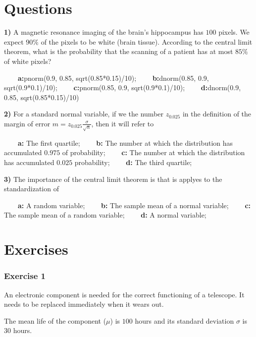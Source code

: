 \documentclass[
]{book}
\begin{document}
\hypertarget{questions-8}{%
\section{Questions}\label{questions-8}}

\textbf{1)} A magnetic resonance imaging of the brain's hippocampus has \(100\) pixels. We expect \(90\%\) of the pixels to be white (brain tissue). According to the central limit theorem, what is the probability that the scanning of a patient has at most \(85\%\) of white pixels?

\textbf{\(\qquad\)a:}pnorm(0.9, 0.85, sqrt(0.85*0.15)/10); \textbf{\(\qquad\)b:}dnorm(0.85, 0.9,
sqrt(0.9*0.1)/10); \textbf{\(\qquad\)c:}pnorm(0.85, 0.9, sqrt(0.9*0.1)/10); \textbf{\(\qquad\)d:}dnorm(0.9, 0.85, sqrt(0.85*0.15)/10)

\textbf{2)} For a standard normal variable, if we the number \(z_{0.025}\) in the definition of the margin of error \(m=z_{0.025} \frac{\sigma}{\sqrt{n}}\), then it will refer to

\textbf{\(\qquad\)a:} The first quartile; \textbf{\(\qquad\)b:} The number at which the distribution has accumulated \(0.975\) of probability; \textbf{\(\qquad\)c:} The number at which the distribution has accumulated \(0.025\) probability; \textbf{\(\qquad\)d:} The third quartile;

\textbf{3)} The importance of the central limit theorem is that is applyes to the standardization of

\textbf{\(\qquad\)a:} A random variable;
\textbf{\(\qquad\)b:} The sample mean of a normal variable;
\textbf{\(\qquad\)c:} The sample mean of a random variable;
\textbf{\(\qquad\)d:} A normal variable;

\hypertarget{exercises-9}{%
\section{Exercises}\label{exercises-9}}

\hypertarget{exercise-1-8}{%
\subsubsection{Exercise 1}\label{exercise-1-8}}

An electronic component is needed for the correct functioning of a telescope. It needs to be replaced immediately when it wears out.

The mean life of the component (\(\mu\)) is \(100\) hours and its standard deviation \(\sigma\) is \(30\) hours.
\end{document}
